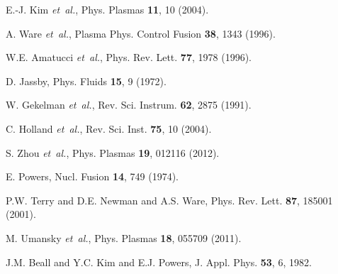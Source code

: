 \documentclass[aip,pop,amsmath,amssymb,reprint,superscriptaddress]{revtex4-1} %
\begin{document}
\begin{thebibliography}{10}
E.-J. Kim {\it et~al.}, Phys. Plasmas {\bf 11},  10  (2004).

A. Ware {\it et~al.}, Plasma Phys. Control Fusion
  {\bf 38},  1343  (1996).

W.E. Amatucci {\it et~al.}, Phys. Rev. Lett. {\bf 77},  1978  (1996).

D. Jassby, Phys. Fluids {\bf 15},  9  (1972).

W. Gekelman {\it et~al.}, Rev. Sci. Instrum. {\bf 62},  2875  (1991).

C. Holland {\it et~al.}, Rev. Sci. Inst. {\bf 75},  10
  (2004).

S. Zhou {\it et~al.}, Phys. Plasmas {\bf 19},  012116  (2012).

E. Powers, Nucl. Fusion {\bf 14},  749  (1974).

P.W. Terry and D.E. Newman and A.S. Ware, Phys. Rev. Lett. {\bf 87}, 185001  (2001).

M. Umansky {\it et~al.}, Phys. Plasmas {\bf 18},  055709  (2011).

J.M. Beall and Y.C. Kim and E.J. Powers, J. Appl. Phys. {\bf 53}, 6, {1982}.

\end{thebibliography}
\end{document}
